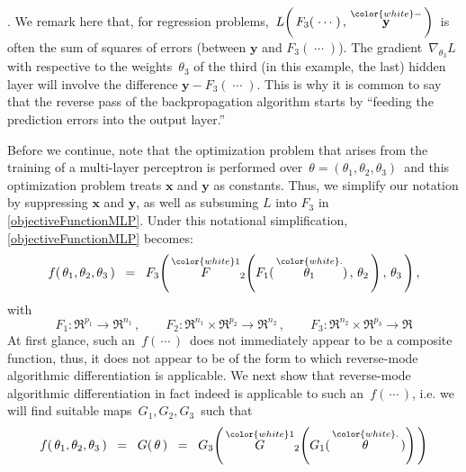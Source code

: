\vskip 0.5cm
\begin{remark}{\color{white}.}
\vskip 0.1cm
\noindent
We remark here that, for regression problems,
\,$L\!\left(\,F_{3}(\;\cdots\;)\,,\,\overset{{\color{white}-}}{\mathbf{y}}\,\right)$\,
is often the sum of squares of errors
(between $\mathbf{y}$ and $F_{3}(\;\cdots\;)$).
The gradient \,$\nabla_{\theta_{3}} L$\, with respective to
the weights \,$\theta_{3}$ of the third (in this example, the last) hidden layer
will involve the difference \;$\mathbf{y} - F_{3}(\;\cdots\;)$.\;
This is why it is common to say that the reverse pass of the backpropagation algorithm
starts by ``{\color{red}feeding} the prediction errors into the output layer.'' 
\end{remark}

\vskip 0.4cm
\noindent
Before we continue, note that the optimization problem that arises from the training
of a multi-layer perceptron is performed over
\,$\theta = (\theta_{1},\theta_{2},\theta_{3})$\,
and this optimization problem treats $\mathbf{x}$ and $\mathbf{y}$ as constants.
Thus, we simplify our notation by suppressing $\mathbf{x}$ and $\mathbf{y}$,
as well as subsuming $L$ into $F_{3}$ in \eqref{objectiveFunctionMLP}.
Under this notational simplification, \eqref{objectiveFunctionMLP} becomes:
\begin{equation*}
f(\,\theta_{1},\theta_{2},\theta_{3}\,)
\;\; = \;\;
	F_{3}\!\left(\,
		\overset{{\color{white}1}}{F}_{2}\!\left(
			F_{1}(\,\overset{{\color{white}.}}{\theta_{1}})\,,\,
			\theta_{2}\,\right),\,
		\theta_{3}\,\right),
\end{equation*}
with
\begin{equation*}
F_{1} : \Re^{p_{1}} \longrightarrow \Re^{n_{1}}\,,
\quad\quad
F_{2} : \Re^{n_{1}} \times \Re^{p_{2}} \longrightarrow \Re^{n_{2}}\,,
\quad\quad
F_{3} : \Re^{n_{2}} \times \Re^{p_{3}} \longrightarrow \Re
\end{equation*}
At first glance, such an \,$f(\,\cdots\,)$\, does not immediately appear to be
a composite function, thus, it does not appear to be of the form
to which reverse-mode algorithmic differentiation is applicable. 
We next show that reverse-mode algorithmic differentiation in fact indeed
is applicable to such an \,$f(\,\cdots\,)$, i.e. we will find suitable maps
\,$G_{1}, G_{2}, G_{3}$\, such that
\begin{equation*}
f(\,\theta_{1},\theta_{2},\theta_{3}\,)
\;\; = \;\;
	G(\,\theta\,)
\;\; = \;\;
	G_{3}\!\left(\,
		\overset{{\color{white}1}}{G}_{2}\!\left(
			G_{1}(\,\overset{{\color{white}.}}{\theta}\,)\right)
		\,\right)
\end{equation*}
